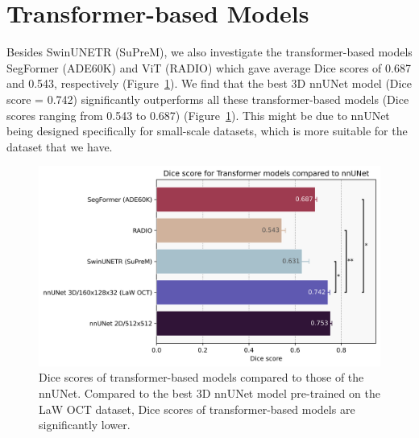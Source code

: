 \documentclass[a4paper,11pt,oneside]{report}
\begin{document}
\section{Transformer-based Models}
Besides SwinUNETR (SuPreM), we also investigate the transformer-based models SegFormer (ADE60K) and ViT (RADIO) which gave average Dice scores of 0.687 and 0.543, respectively (Figure~\ref{fig:transformer-results}). We find that the best 3D nnUNet model (Dice score = 0.742) significantly outperforms all these transformer-based models (Dice scores ranging from 0.543 to 0.687) (Figure~\ref{fig:transformer-results}). This might be due to nnUNet being designed specifically for small-scale datasets, which is more suitable for the dataset that we have.

\begin{figure}[hbt]
    \centering
    \includegraphics[width=0.6\linewidth]{figures/result_nnUNet_vs_Transformer_results.png}
    \caption{Dice scores of transformer-based models compared to those of the nnUNet. Compared to the best 3D nnUNet model pre-trained on the LaW OCT dataset, Dice scores of transformer-based models are significantly lower.}
    \label{fig:transformer-results}
\end{figure}
\end{document}
